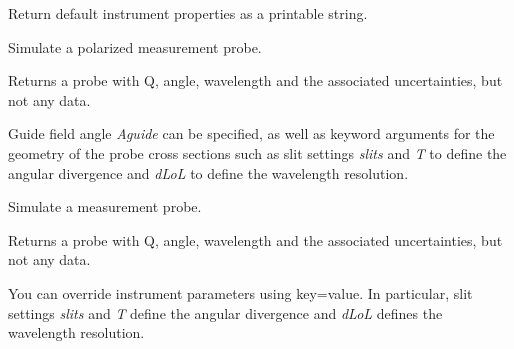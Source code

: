 \documentclass[letterpaper,10pt,english]{sphinxmanual}
\begin{document}
\begin{fulllineitems}
\begin{fulllineitems}
\end{fulllineitems}


\begin{fulllineitems}
\label{api/snsdata:refl1d.snsdata.Liquids.defaults}
Return default instrument properties as a printable string.

\end{fulllineitems}


\begin{fulllineitems}
\label{api/snsdata:refl1d.snsdata.Liquids.load}
\end{fulllineitems}


\begin{fulllineitems}
\label{api/snsdata:refl1d.snsdata.Liquids.magnetic_probe}
Simulate a polarized measurement probe.

Returns a probe with Q, angle, wavelength and the associated
uncertainties, but not any data.

Guide field angle \emph{Aguide} can be specified, as well as keyword
arguments for the geometry of the probe cross sections such as
slit settings \emph{slits} and \emph{T} to define the angular divergence
and \emph{dLoL} to define the wavelength resolution.

\end{fulllineitems}


\begin{fulllineitems}
\label{api/snsdata:refl1d.snsdata.Liquids.probe}
Simulate a measurement probe.

Returns a probe with Q, angle, wavelength and the associated
uncertainties, but not any data.

You can override instrument parameters using key=value.
In particular, slit settings \emph{slits} and \emph{T} define
the angular divergence and \emph{dLoL} defines the wavelength
resolution.


\end{fulllineitems}
\end{fulllineitems}
\end{document}

